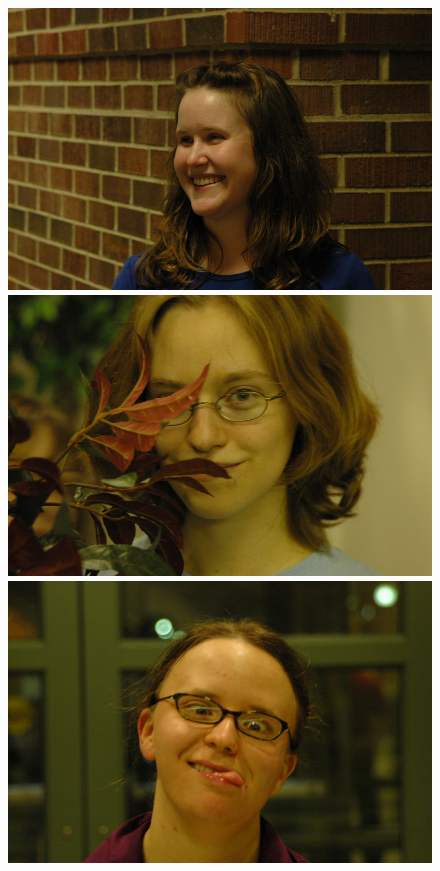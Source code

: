 \begin{figure}
\includegraphics[scale=0.35,clip=true]{figures_cvpr/examples/5/success/DSC_1871.JPG} 
\includegraphics[scale=0.35,clip=true]{figures_cvpr/examples/5/success/DSC_1913.JPG} 
\includegraphics[scale=0.35,clip=true]{figures_cvpr/examples/5/success/DSC_2005.JPG} \\

\end{figure}
